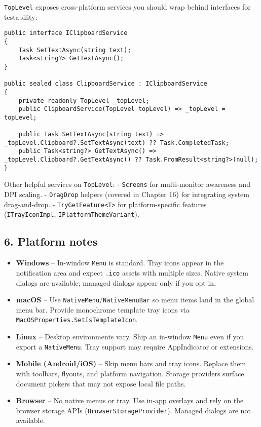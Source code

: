 \passthrough{\lstinline!TopLevel!} exposes cross-platform services you
should wrap behind interfaces for testability:

\begin{lstlisting}
public interface IClipboardService
{
    Task SetTextAsync(string text);
    Task<string?> GetTextAsync();
}

public sealed class ClipboardService : IClipboardService
{
    private readonly TopLevel _topLevel;
    public ClipboardService(TopLevel topLevel) => _topLevel = topLevel;

    public Task SetTextAsync(string text) => _topLevel.Clipboard?.SetTextAsync(text) ?? Task.CompletedTask;
    public Task<string?> GetTextAsync() => _topLevel.Clipboard?.GetTextAsync() ?? Task.FromResult<string?>(null);
}
\end{lstlisting}

Other helpful services on \passthrough{\lstinline!TopLevel!}: -
\passthrough{\lstinline!Screens!} for multi-monitor awareness and DPI
scaling. - \passthrough{\lstinline!DragDrop!} helpers (covered in
Chapter 16) for integrating system drag-and-drop. -
\passthrough{\lstinline!TryGetFeature<T>!} for platform-specific
features (\passthrough{\lstinline!ITrayIconImpl!},
\passthrough{\lstinline!IPlatformThemeVariant!}).

\subsection{6. Platform notes}\label{platform-notes}

\begin{itemize}
\tightlist
\item
  \textbf{Windows} -- In-window \passthrough{\lstinline!Menu!} is
  standard. Tray icons appear in the notification area and expect
  \passthrough{\lstinline!.ico!} assets with multiple sizes. Native
  system dialogs are available; managed dialogs appear only if you opt
  in.
\item
  \textbf{macOS} -- Use
  \passthrough{\lstinline!NativeMenu!}/\passthrough{\lstinline!NativeMenuBar!}
  so menu items land in the global menu bar. Provide monochrome template
  tray icons via
  \passthrough{\lstinline!MacOSProperties.SetIsTemplateIcon!}.
\item
  \textbf{Linux} -- Desktop environments vary. Ship an in-window
  \passthrough{\lstinline!Menu!} even if you export a
  \passthrough{\lstinline!NativeMenu!}. Tray support may require
  AppIndicator or extensions.
\item
  \textbf{Mobile (Android/iOS)} -- Skip menu bars and tray icons.
  Replace them with toolbars, flyouts, and platform navigation. Storage
  providers surface document pickers that may not expose local file
  paths.
\item
  \textbf{Browser} -- No native menus or tray. Use in-app overlays and
  rely on the browser storage APIs
  (\passthrough{\lstinline!BrowserStorageProvider!}). Managed dialogs
  are not available.
\end{itemize}

